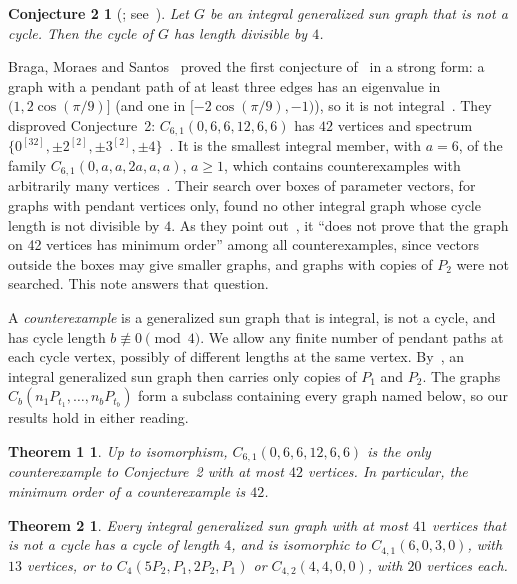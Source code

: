 \documentclass[11pt]{article}
\newtheorem*{thmone}{Theorem 1}
\newtheorem*{thmtwo}{Theorem 2}
\newtheorem*{conjtwo}{Conjecture 2}
\theoremstyle{definition}
\theoremstyle{remark}
\begin{document}
\begin{conjtwo}[{\cite{bdr}; see~\cite[Conjecture~2]{bms}}]
Let $G$ be an integral generalized sun graph that is not a cycle. Then the
cycle of $G$ has length divisible by $4$.
\end{conjtwo}

Braga, Moraes and Santos~\cite{bms} proved the first conjecture of~\cite{bdr}
in a strong form: a graph with a pendant path of at least three edges has an
eigenvalue in $(1,2\cos(\pi/9)]$ (and one in $[-2\cos(\pi/9),-1)$), so it is
not integral~\cite[Theorem~2.1]{bms}.
They disproved Conjecture~2: $C_{6,1}(0,6,6,12,6,6)$ has $42$ vertices and
spectrum $\{0^{[32]},\pm2^{[2]},\pm3^{[2]},\pm4\}$~\cite[Proposition~3.2]{bms}.
It is the smallest integral member, with $a=6$, of the family
$C_{6,1}(0,a,a,2a,a,a)$, $a\ge1$, which contains counterexamples with
arbitrarily many vertices~\cite[Corollary~3.6 and the remark after it]{bms}.
Their search over boxes of parameter vectors, for graphs with pendant vertices
only, found no other integral graph whose cycle length is not divisible by
$4$. As they point out~\cite[Section~4]{bms}, it ``does not prove that the
graph on 42 vertices has minimum order'' among all counterexamples, since
vectors outside the boxes may give smaller graphs, and graphs with copies of
$P_2$ were not searched. This note answers that question.

A \emph{counterexample} is a generalized sun graph that is integral, is not a
cycle, and has cycle length $b\not\equiv0\pmod4$. We allow any finite number of
pendant paths at each cycle vertex, possibly of different lengths at the same
vertex. By~\cite[Theorem~2.1]{bms}, an integral generalized sun graph
then carries only copies of $P_1$ and $P_2$. The graphs
$C_b(n_1P_{t_1},\dots,n_bP_{t_b})$ form a subclass containing every graph
named below, so our results hold in either reading.

\begin{thmone}
Up to isomorphism, $C_{6,1}(0,6,6,12,6,6)$ is the only counterexample to
Conjecture~2 with at most $42$ vertices. In particular, the minimum order of a
counterexample is $42$.
\end{thmone}

\begin{thmtwo}
Every integral generalized sun graph with at most $41$ vertices that is not a
cycle has a cycle of length $4$, and is isomorphic to $C_{4,1}(6,0,3,0)$, with
$13$ vertices, or to $C_4(5P_2,P_1,2P_2,P_1)$ or $C_{4,2}(4,4,0,0)$, with $20$
vertices each.
\end{thmtwo}
\end{document}

